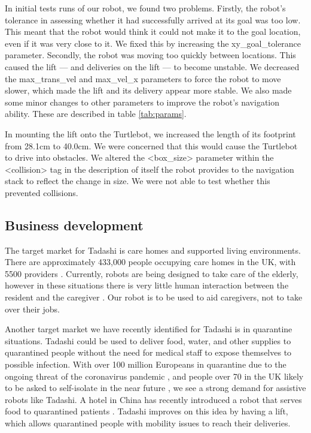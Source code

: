 \documentclass{article}
\begin{document}
In initial tests runs of our robot, we found two problems.
Firstly, the robot's tolerance in assessing whether it had successfully arrived at its goal was too low. This meant that the robot would think it could not make it to the goal location, even if it was very close to it. We fixed this by increasing the xy\_goal\_tolerance parameter.
Secondly, the robot was moving too quickly between locations. This caused the lift --- and deliveries on the lift --- to become unstable. We decreased the max\_trans\_vel and max\_vel\_x parameters to force the robot to move slower, which made the lift and its delivery appear more stable.
We also made some minor changes to other parameters to improve the robot's navigation ability. These are described in table \ref{tab:params}.  

In mounting the lift onto the Turtlebot, we increased the length of its footprint from 28.1cm to 40.0cm. We were concerned that this would cause the Turtlebot to drive into obstacles. We altered the <box\_size> parameter within the <collision> tag in the description of itself the robot provides to the navigation stack to reflect the change in size. We were not able to test whether this prevented collisions.


\subsection{Business development}
The target market for Tadashi is care homes and supported living environments. There are approximately 433,000 people occupying care homes in the UK, with 5500 providers \cite{carehomes}. Currently, robots are being designed to take care of the elderly, however in these situations there is very little human interaction between the resident and the caregiver \cite{robotcarers}. Our robot is to be used to aid caregivers, not to take over their jobs.

Another target market we have recently identified for Tadashi is in quarantine situations. Tadashi could be used to deliver food, water, and other supplies to quarantined people without the need for medical staff to expose themselves to possible infection. With over 100 million Europeans in quarantine due to the ongoing threat of the coronavirus pandemic \cite{quarantine}, and people over 70 in the UK likely to be asked to self-isolate in the near future \cite{isolate}, we see a strong demand for assistive robots like Tadashi. A hotel in China has recently introduced a robot that serves food to quarantined patients \cite{peanut}. Tadashi improves on this idea by having a lift, which allows quarantined people with mobility issues to reach their deliveries.
\end{document}

